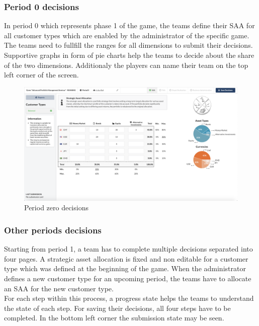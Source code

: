 \subsubsection{Period 0 decisions}
In period 0 which represents phase 1 of the game, the teams define their SAA for all customer types which are enabled by the administrator of the specific game. The teams need to fullfill the ranges for all dimensions to submit their decisions. Supportive graphs in form of pie charts help the teams to decide about the share of the two dimensions. Additionaly the players can name their team on the top left corner of the screen.
\begin{figure}[h!]
  \centering
  \includegraphics[scale=0.2]{img/application-overview/teams/02_period_zero_decisions.png}
  \caption{Period zero decisions}
\end{figure}

\subsubsection{Other periods decisions}
Starting from period 1, a team has to complete multiple decisions separated into four pages. A strategic asset allocation is fixed and non editable for a customer type which was defined at the beginning of the game. When the administrator defines a new customer type for an upcoming period, the teams have to allocate an SAA for the new customer type.\\

For each step within this process, a progress state helps the teams to understand the state of each step. For saving their decisions, all four steps have to be completed. In the bottom left corner the submission state may be seen.

